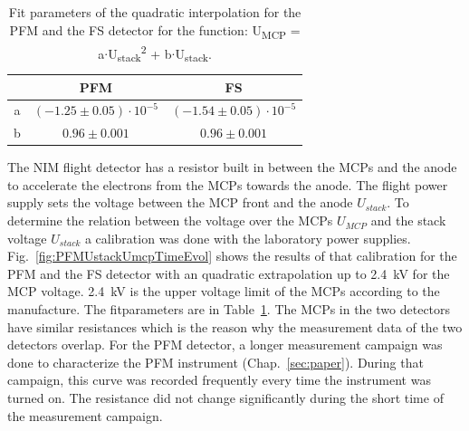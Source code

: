 	\begin{table}[H] %
		\begin{center}
			\begin{tabular}{c|c|c|}
				& PFM	& FS\\ \hline
				a	& $(-1.25 \pm 0.05)\cdot10^{-5}$ & $(-1.54 \pm 0.05)\cdot10^{-5}$ \\
				b 	& $0.96 \pm 0.001$	& $0.96 \pm 0.001$\\
			\end{tabular}
		\end{center}
		\caption{Fit parameters of the quadratic interpolation for the PFM and the FS detector for the function: U\textsubscript{MCP} = a$\cdot$U\textsubscript{stack}\textsuperscript{2} + b$\cdot$U\textsubscript{stack}.}
		\label{tab:UstackUmcpFitParams}
	\end{table}
	The NIM flight detector has a resistor built in between the MCPs and the anode to accelerate the electrons from the MCPs towards the anode. The flight power supply sets the voltage between the MCP front and the anode $U_{stack}$. To determine the relation between the voltage over the MCPs $U_{MCP}$ and the stack voltage $U_{stack}$ a calibration was done with the laboratory power supplies. Fig.~\ref{fig:PFMUstackUmcpTimeEvol} shows the results of that calibration for the PFM and the FS detector with an quadratic extrapolation up to 2.4~kV for the MCP voltage. 2.4~kV is the upper voltage limit of the MCPs according to the manufacture. The fitparameters are in Table~\ref{tab:UstackUmcpFitParams}. The MCPs in the two detectors have similar resistances which is the reason why the measurement data of the two detectors overlap. For the PFM detector, a longer measurement campaign was done to characterize the PFM instrument (Chap.~\ref{sec:paper}). During that campaign, this curve was recorded frequently every time the instrument was turned on. The resistance did not change significantly during the short time of the measurement campaign.
	
	

